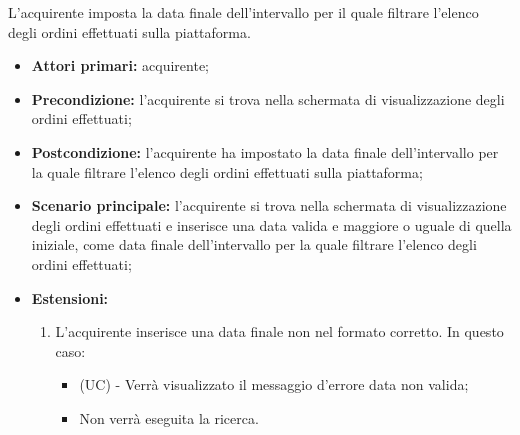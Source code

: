 L'acquirente imposta la data finale dell'intervallo per il quale filtrare l'elenco degli ordini effettuati sulla piattaforma.
\begin{itemize}
    \item \textbf{Attori primari:} acquirente;
    \item \textbf{Precondizione:} l'acquirente si trova nella schermata di visualizzazione degli ordini effettuati;
    \item \textbf{Postcondizione:} l'acquirente ha impostato la data finale dell'intervallo per la quale filtrare l'elenco degli ordini effettuati sulla piattaforma;
    \item \textbf{Scenario principale:} l'acquirente si trova nella schermata di visualizzazione degli ordini effettuati e inserisce una data valida e maggiore o uguale di quella iniziale, come data finale dell'intervallo per la quale filtrare l'elenco degli ordini effettuati;
    \item \textbf{Estensioni:}
    \begin{enumerate}[label=\lett]
        \item L'acquirente inserisce una data finale non nel formato corretto. In questo caso:
        \begin{itemize}
            \item (UC) - Verrà visualizzato il messaggio d'errore data non valida;
            \item Non verrà eseguita la ricerca.
        \end{itemize} 
    \end{enumerate}
\end{itemize}
